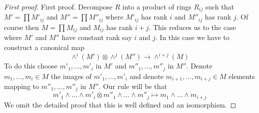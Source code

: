 \documentclass[10pt,a4paper]{amsart}
\theoremstyle{plain}
\theoremstyle{definition}
\theoremstyle{remark}
\numberwithin{equation}{subsection}
\begin{document}
\begin{proof}[First proof]
First proof. Decompose $R$ into a product of rings $R_{ij}$ such that
$M' = \prod M'_{ij}$ and $M'' = \prod M''_{ij}$ where
$M'_{ij}$ has rank $i$ and $M''_{ij}$ has rank $j$.
Of course then $M = \prod M_{ij}$ and $M_{ij}$ has rank $i + j$.
This reduces us to the case where $M'$ and $M''$ have constant
rank say $i$ and $j$. In this case we have to construct a canonical
map
$$
\wedge^i(M') \otimes \wedge^j(M'') \longrightarrow \wedge^{i + j}(M)
$$
To do this choose $m'_1, \ldots, m'_i$ in $M'$ and
$m''_1, \ldots, m''_j$ in $M''$. Denote $m_1, \ldots, m_i \in M$
the images of $m'_1, \ldots, m'_i$ and denote
$m_{i + 1}, \ldots , m_{i + j} \in M$ elements mapping to
$m''_1, \ldots, m''_j$ in $M''$. Our rule will be that
$$
m'_1 \wedge \ldots \wedge m'_i \otimes
m''_1 \wedge \ldots \wedge m''_j
\longmapsto
m_1 \wedge \ldots \wedge m_{i + j}
$$
We omit the detailed proof that this is well defined and an isomorphism.
\end{proof}
\end{document}
